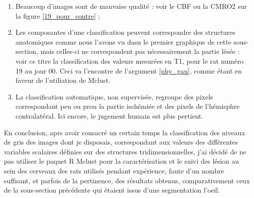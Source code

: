 \begin{enumerate}[label=\textbf{(Contre\arabic*)}]
\item Beaucoup d'images sont de mauvaise qualit\'e : voir le CBF ou la CMRO2 sur la figure \ref{19_pour_contre} ;
%
\item Les composantes d'une classification peuvent correspondre  des structures anatomiques comme nous l'avons vu dasn le premier graphique de cette sous-section, %
mais celles-ci ne correspondent pas n\'ecessairement  la partie l\'es\'ee : %
voir  ce titre la classification des valeurs mesur\'ees en T1, pour le rat num\'ero 19 au jour 00. %
Ceci va  l'encontre de l'argument \ref{phy_gau}, comme \'etant en faveur de l'utiliation de Mclust.
%
\item La classification automatique, non supervis\'ee, regroupe des pixels correspondant peu ou prou  la partie isch\'emi\'ee et des pixels de l'h\'emisphre contralat\'eral. %
Ici encore, le jugement humain est plus pertient.
\end{enumerate}







\ligneinter
En conclusion, aprs avoir consacr\'e un certain temps  la classification des niveaux de gris des images dont je disposais, %
correspondant aux valeurs des diff\'erentes variables scalaires d\'efinies sur des structures tridimensionnelles, %
j'ai d\'ecid\'e de ne pas utiliser le paquet R Mclust pour la caract\'erisation et le suivi des l\'esion au sein des cerveaux des rats utilis\'es pendant exp\'erience, %
faute d'un nombre suffisant, et parfois de la pertinence, des r\'esultats obtenus, %
comparativement  ceux de la sous-section pr\'ec\'edente qui \'etaient issus d'une segmentation  l'oeil.


